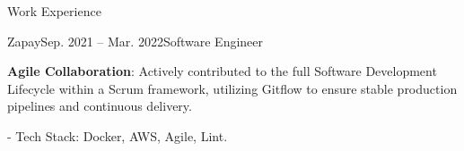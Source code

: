 \documentclass{resume} %
\begin{document}
\begin{rSection}{Work Experience}
\begin{rSubsection}{Zapay}{Sep. 2021 -- Mar. 2022}{Software Engineer}{}
\item \textbf{Agile Collaboration}: Actively contributed to the full Software Development Lifecycle within a Scrum framework, utilizing 
Gitflow to ensure stable production pipelines and continuous delivery.

- Tech Stack: Docker, AWS, Agile, Lint.
\end{rSubsection}





\end{rSection}

\end{document}
